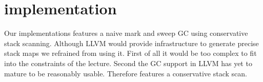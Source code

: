 \section{\Rift implementation}

Our \rift implementations features a naive mark and sweep GC using conservative stack scanning. Although LLVM would provide infrastructure to generate precise stack maps we refrained from using it. First of all it would be too complex to fit into the constraints of the lecture. Second the GC support in LLVM has yet to mature to be reasonably usable. Therefore \rift features a conservative stack scan.
